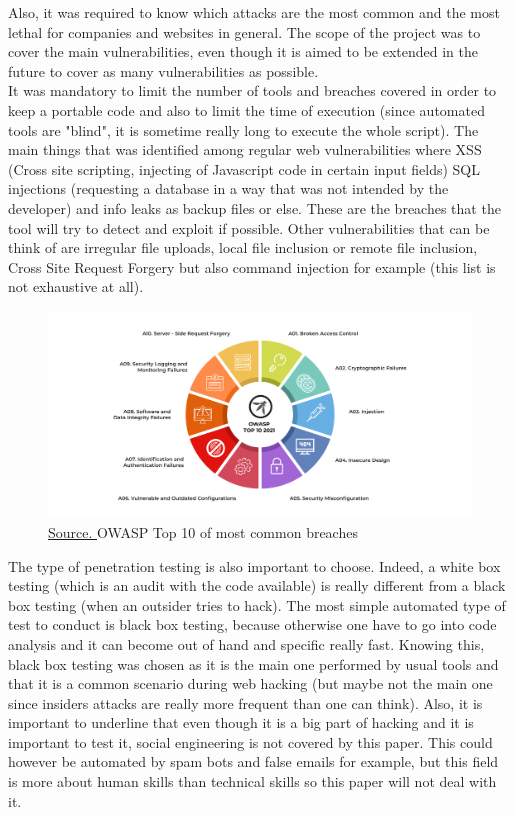 \documentclass[a4paper,12pt,fleqn]{article}
\begin{document}
Also, it was required to know which attacks are the most common and the most lethal for companies and websites in general. The scope of the project was to cover the main vulnerabilities, even though it is aimed to be extended in the future to cover as many vulnerabilities as possible. \\It was mandatory to limit the number of tools and breaches covered in order to keep a portable code and also to limit the time of execution (since automated tools are "blind", it is sometime really long to execute the whole script). The main things that was identified among regular web vulnerabilities where XSS (Cross site scripting, injecting of Javascript code in certain input fields) SQL injections (requesting a database in a way that was not intended by the developer) and info leaks as backup files or else\cite{vuln}. These are the breaches that the tool will try to detect and exploit if possible. Other vulnerabilities that can be think of are irregular file uploads, local file inclusion or remote file inclusion, Cross Site Request Forgery but also command injection for example (this list is not exhaustive at all).

\begin{figure}[h]
    \centering
    \includegraphics[scale = 0.23]{images/Infographic - OWASP Top 10 2021.png}
    \caption{\href{https://prismic-io.s3.amazonaws.com/horangiweb/22887c0e-2492-421f-8bbf-bdcb7fac4b5f_Infographic+-+OWASP+Top+10+2021.png}{Source. }OWASP Top 10 of most common breaches}
\end{figure}

The type of penetration testing is also important to choose\cite{type}. Indeed, a white box testing (which is an audit with the code available) is really different from a black box testing (when an outsider tries to hack). The most simple automated type of test to conduct is black box testing, because otherwise one have to go into code analysis and it can become out of hand and specific really fast. Knowing this, black box testing was chosen as it is the main one performed by usual tools and that it is a common scenario during web hacking (but maybe not the main one since insiders attacks are really more frequent than one can think). Also, it is important to underline that even though it is a big part of hacking and it is important to test it, social engineering is not covered by this paper. This could however be automated by spam bots and false emails for example, but this field is more about human skills than technical skills so this paper will not deal with it.
\\
\end{document}
